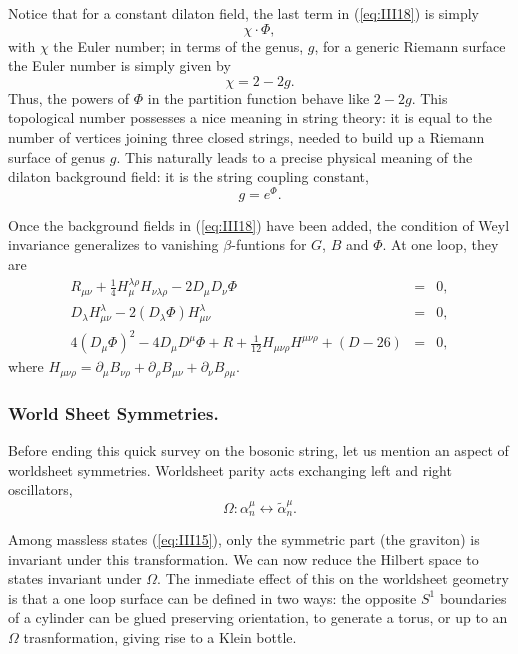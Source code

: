 Notice that for a
constant dilaton field, the last term in (\ref{eq:III18}) is
simply
\begin{equation}
\chi \cdot \Phi,
\label{eq:III19}
\end{equation}
with $\chi$ the Euler number; in terms of the genus, $g$, for a
generic Riemann surface the Euler number is simply given by
\begin{equation}
\chi = 2-2g.
\label{eq:III20}
\end{equation}
Thus, the powers of $\Phi$ in the partition function behave like
$2-2g$. This topological number possesses a nice meaning in
string theory: it is equal to the number of vertices joining
three closed strings, needed to build up a Riemann surface of
genus $g$. This naturally leads to a precise physical meaning of
the dilaton background field: it is the string coupling constant,
\begin{equation}
g=e^{\Phi}.
\label{eq:III21}
\end{equation}
  
Once the background fields in (\ref{eq:III18}) have been added,
the condition of Weyl invariance generalizes to vanishing
$\beta$-funtions for $G$, $B$ and $\Phi$. At one loop, they are
\begin{eqnarray}
R_{\mu \nu} + \frac {1}{4} H_{\mu} ^{\lambda \rho}H_{\nu \lambda
\rho}- 2 D_{\mu} D_{\nu} \Phi & = & 0, \nonumber \\
D_{\lambda} H^{\lambda}_{\mu \nu} - 2 (D_{\lambda} \Phi) H_{\mu
\nu}^{\lambda} & = & 0, \nonumber \\
4 (D_{\mu} \Phi)^2 - 4 D_{\mu} D^{\mu} \Phi + R + \frac
{1}{12}H_{\mu \nu \rho} H^{\mu \nu \rho} + (D-26) & = & 0,
\label{eq:III22}
\end{eqnarray}
where $H_{\mu \nu \rho} = \partial_{\mu} B_{\nu \rho} +
\partial_{\rho} B_{\mu \nu} + \partial_{\nu} B_{\rho \mu}$.
  
\subsubsection{World Sheet Symmetries.}


Before ending this quick survey on the bosonic string, let us
mention an aspect of worldsheet symmetries. Worldsheet parity 
acts exchanging left and right oscillators,
\begin{equation}
\Omega: \alpha_n^{\mu} \leftrightarrow \tilde{\alpha}_n^{\mu}.
\label{eq:III23}
\end{equation}
  
Among massless states (\ref{eq:III15}), only the symmetric part (the graviton) 
is invariant under this transformation. We can now reduce the Hilbert 
space to states invariant under $\Omega$. The inmediate effect of this 
on the worldsheet geometry is that a one loop surface can be defined in 
two ways: the opposite $S^1$ boundaries of a cylinder can be glued 
preserving orientation, to generate a torus, or up to an $\Omega$ 
trasnformation, giving rise to a Klein bottle.

